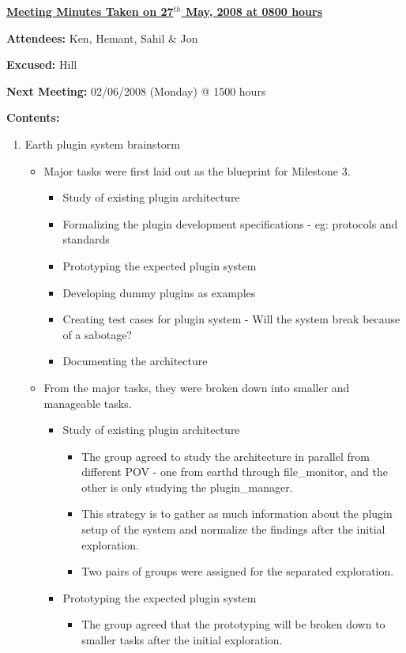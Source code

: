 \documentclass{letter}
\begin{document}
{\large \textbf{\underline{Meeting Minutes Taken on 27$^{th}$ May, 2008 at 0800 hours}}}

\textbf{Attendees:} Ken, Hemant, Sahil \& Jon 

\textbf{Excused:} Hill

\textbf{Next Meeting:} 02/06/2008 (Monday) @ 1500 hours 

\textbf{Contents:}

\begin{enumerate}
\item Earth plugin system brainstorm
	\begin{itemize}
		\item Major tasks were first laid out as the blueprint for Milestone 3.
			\begin{itemize}
				\item Study of existing plugin architecture
				\item Formalizing the plugin development specifications - eg: protocols and standards
				\item Prototyping the expected plugin system 
				\item Developing dummy plugins as examples
				\item Creating test cases for plugin system - Will the system break because of a sabotage?
				\item Documenting the architecture
			\end{itemize}
		\item From the major tasks, they were broken down into smaller and manageable tasks.
			\begin{itemize}
				\item Study of existing plugin architecture
					\begin{itemize}
						\item The group agreed to study the architecture in parallel from different POV - one from earthd through file\_monitor, and the other is only studying the plugin\_manager. 
						\item This strategy is to gather as much information about the plugin setup of the system and normalize the findings after the initial exploration.
						\item Two pairs of groups were assigned for the separated exploration. 
					\end{itemize}
				\item Prototyping the expected plugin system
					\begin{itemize}
						\item The group agreed that the prototyping will be broken down to smaller tasks after the initial exploration.

\end{itemize}
\end{itemize}
\end{itemize}
\end{enumerate}
\end{document}
